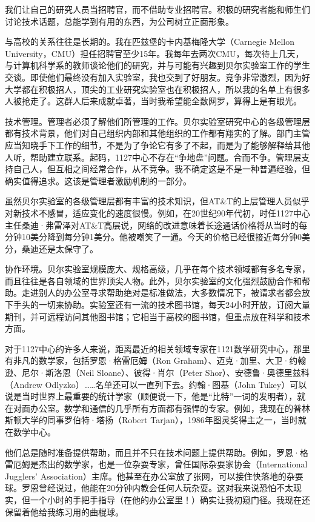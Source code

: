 \documentclass[a4paper,12pt,UTF8,twoside]{ctexbook}
\begin{document}
{{我们让自己的研究人员当招聘官，而不借助专业招聘官。积极的研究者能和师生们讨论技术话题，总能学到有用的东西，为公司树立正面形象。

与高校的关系往往是长期的。我在匹兹堡的卡内基梅隆大学（Carnegie Mellon University，CMU）担任招聘官至少15年。我每年去两次CMU，每次待上几天，与计算机科学系的教师谈论他们的研究，并与可能有兴趣到贝尔实验室工作的学生交谈。即使他们最终没有加入实验室，我也交到了好朋友。竞争非常激烈，因为好大学都在积极招人，顶尖的工业研究实验室也在积极招人，所以我的名单上有很多人被抢走了。这群人后来成就卓著，当时我希望能全数网罗，算得上是有眼光。

技术管理。管理者必须了解他们所管理的工作。贝尔实验室研究中心的各级管理层都有技术背景，他们对自己组织内部和其他组织的工作都有翔实的了解。部门主管应当知晓手下工作的细节，不是为了争论它有多了不起，而是为了能够解释给其他人听，帮助建立联系。起码，1127中心不存在“争地盘”问题。合而不争。管理层支持自己人，但互相之间经常合作，从不竞争。我不确定这是不是一种普遍经验，但确实值得追求。这该是管理者激励机制的一部分。

虽然贝尔实验室的各级管理层都有丰富的技术知识，但AT\&T的上层管理人员似乎对新技术不感冒，适应变化的速度很慢。例如，在20世纪90年代初，时任1127中心主任桑迪·弗雷泽对AT\&T高层说，网络的改进意味着长途通话价格将从当时的每分钟10美分降到每分钟1美分。他被嘲笑了一通。今天的价格已经很接近每分钟0美分，桑迪还是太保守了。

协作环境。贝尔实验室规模庞大、规格高级，几乎在每个技术领域都有多名专家，而且往往是各自领域的世界顶尖人物。此外，贝尔实验室的文化强烈鼓励合作和帮助。走进别人的办公室寻求帮助绝对是标准做法，大多数情况下，被请求者都会放下手头的一切来协助。实验室还有一流的技术图书馆，每天24小时开放，订阅大量期刊，并可远程访问其他图书馆；它相当于高校的图书馆，但重点放在科学和技术方面。

对于1127中心的许多人来说，距离最近的相关领域专家在1121数学研究中心，那里有非凡的数学家，包括罗恩·格雷厄姆（Ron Graham）、迈克·加里、大卫·约翰逊、尼尔·斯洛恩（Neil Sloane）、彼得·肖尔（Peter Shor）、安德鲁·奥德里兹科（Andrew Odlyzko）……名单还可以一直列下去。约翰·图基（John Tukey）可以说是当时世界上最重要的统计学家（顺便说一下，他是“比特”一词的发明者），就在对面办公室。数学和通信的几乎所有方面都有强悍的专家。例如，我现在的普林斯顿大学的同事罗伯特·塔扬（Robert Tarjan），1986年图灵奖得主之一，当时就在数学中心。

他们总是随时准备提供帮助，而且并不只在技术问题上提供帮助。例如，罗恩·格雷厄姆是杰出的数学家，也是一位杂耍专家，曾任国际杂耍家协会（International Jugglers’ Association）主席。他甚至在办公室放了张网，可以接住快落地的杂耍球。罗恩曾经说过，他能在20分钟内教会任何人玩杂耍。这对我来说恐怕不太现实，但一个小时的手把手指导（在他的办公室里！）确实让我初窥门径。我现在还保留着他给我练习用的曲棍球。

}}
\end{document}
